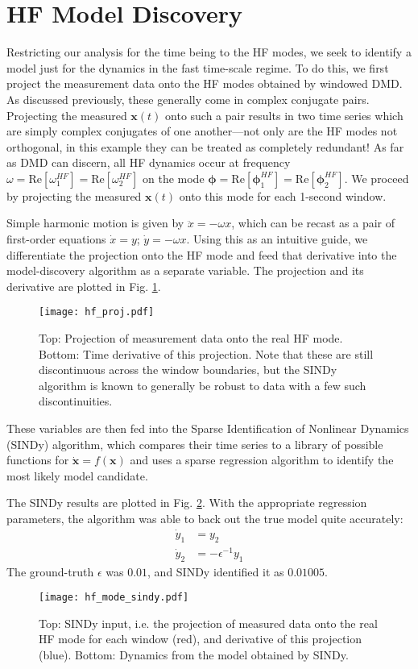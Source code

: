 \documentclass[11pt]{article} %
\begin{document}
\section{HF Model Discovery}
Restricting our analysis for the time being to the HF modes, we seek to identify a model just for the dynamics in the fast time-scale regime. To do this, we first project the measurement data onto the HF modes obtained by windowed DMD. As discussed previously, these generally come in complex conjugate pairs. Projecting the measured $\bm{x}(t)$ onto such a pair results in two time series which are simply complex conjugates of one another---not only are the HF modes not orthogonal, in this example they can be treated as completely redundant! As far as DMD can discern, all HF dynamics occur at frequency $\omega = \text{Re}[\omega_1^{HF}] = \text{Re}[\omega_2^{HF}]$ on the mode $\bm{\phi} = \text{Re}[\bm{\phi}_1^{HF}] = \text{Re}[\bm{\phi}_2^{HF}]$. We proceed by projecting the measured $\bm{x}(t)$ onto this mode for each 1-second window.

Simple harmonic motion is given by $\ddot{x} = -\omega x$, which can be recast as a pair of first-order equations $\dot{x} = y$; $\dot{y} = -\omega x$. Using this as an intuitive guide, we differentiate the projection onto the HF mode and feed that derivative into the model-discovery algorithm as a separate variable. The projection and its derivative are plotted in Fig. \ref{fig:hf_proj}.

\begin{figure}
\centering
\texttt{[image: hf\_proj.pdf]}
\caption{Top: Projection of measurement data onto the real HF mode. Bottom: Time derivative of this projection. Note that these are still discontinuous across the window boundaries, but the SINDy algorithm is known to generally be robust to data with a few such discontinuities.}
\label{fig:hf_proj}
\end{figure}

These variables are then fed into the Sparse Identification of Nonlinear Dynamics (SINDy) algorithm, which compares their time series to a library of possible functions for $\dot{\bm{x}} = f(\bm{x})$ and uses a sparse regression algorithm to identify the most likely model candidate.

The SINDy results are plotted in Fig. \ref{fig:hf_mode_sindy}. With the appropriate regression parameters, the algorithm was able to back out the true model quite accurately:
\begin{equation}
\begin{split}
\dot{y}_1 &= y_2\\
\dot{y}_2 &= -\epsilon^{-1}y_1
\end{split}
\end{equation}
The ground-truth $\epsilon$ was $0.01$, and SINDy identified it as $0.01005$.
\begin{figure}
\centering
\texttt{[image: hf\_mode\_sindy.pdf]}
\caption{Top: SINDy input, i.e. the projection of measured data onto the real HF mode for each window (red), and derivative of this projection (blue). Bottom: Dynamics from the model obtained by SINDy.}
\label{fig:hf_mode_sindy}
\end{figure}
\end{document}
